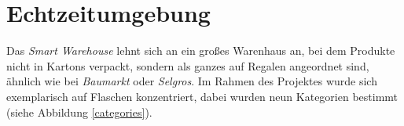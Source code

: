 \section{Echtzeitumgebung}

Das \textit{Smart Warehouse} lehnt sich an ein großes Warenhaus an, bei dem Produkte nicht in Kartons verpackt, sondern als ganzes auf Regalen angeordnet sind, ähnlich wie bei \textit{Baumarkt} oder \textit{Selgros}. Im Rahmen des Projektes wurde sich exemplarisch auf Flaschen konzentriert, dabei wurden neun Kategorien bestimmt (siehe Abbildung \ref{categories}). 

\begin{figure}[htb]

\end{figure}
